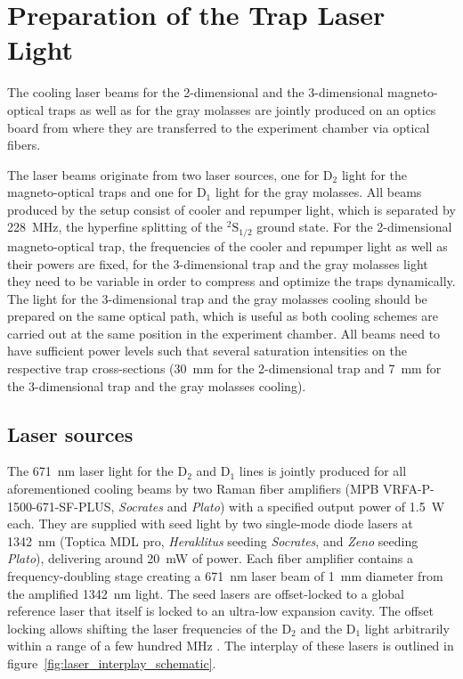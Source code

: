 
\section{Preparation of the Trap Laser Light}
The cooling laser beams for the 2-dimensional and the 3-dimensional magneto-optical traps as well as for the gray molasses are jointly produced on an optics board from where they are transferred to the experiment chamber via optical fibers.

The laser beams originate from two laser sources, one for D$_2$ light for the magneto-optical traps and one for D$_1$ light for the gray molasses. All beams produced by the setup consist of cooler and repumper light, which is separated by \SI{228}{\mega\hertz}, the hyperfine splitting of the $^2\text{S}_{1/2}$ ground state. For the 2-dimensional magneto-optical trap, the frequencies of the cooler and repumper light as well as their powers are fixed, for the 3-dimensional trap and the gray molasses light they need to be variable in order to compress and optimize the traps dynamically. The light for the 3-dimensional trap and the gray molasses cooling should be prepared on the same optical path, which is useful as both cooling schemes are carried out at the same position in the experiment chamber. All beams need to have sufficient power levels such that several saturation intensities on the respective trap cross-sections (\SI{30}{\milli\meter} for the 2-dimensional trap and \SI{7}{\milli\meter} for the 3-dimensional trap and the gray molasses cooling).

\subsection*{Laser sources}
The \SI{671}{\nano\meter} laser light for the D$_2$ and D$_1$ lines is jointly produced for all aforementioned cooling beams by two Raman fiber amplifiers (MPB VRFA-P-1500-671-SF-PLUS, \textit{Socrates} and \textit{Plato}) with a specified output power of \SI{1.5}{\watt} each. They are supplied with seed light by two single-mode diode lasers at \SI{1342}{\nano\meter} (Toptica MDL pro, \textit{Heraklitus} seeding \textit{Socrates}, and \textit{Zeno} seeding \textit{Plato}), delivering around \SI{20}{\milli\watt} of power. Each fiber amplifier contains a frequency-doubling stage creating a \SI{671}{\nano\meter} laser beam of \SI{1}{\milli\meter} diameter from the amplified \SI{1342}{\nano\meter} light. The seed lasers are offset-locked to a global reference laser that itself is locked to an ultra-low expansion cavity. The offset locking allows shifting the laser frequencies of the D$_2$ and the D$_1$ light arbitrarily within a range of a few hundred \si{\mega\hertz} . The interplay of these lasers is outlined in figure~\ref{fig:laser_interplay_schematic}.

